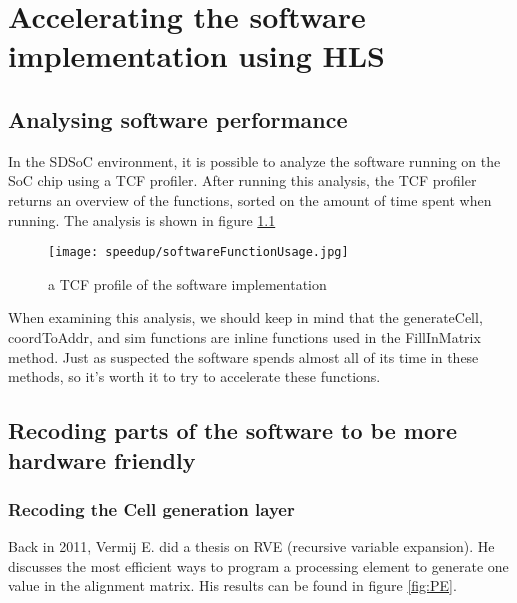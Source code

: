 
\chapter{Accelerating the software implementation using HLS}
\label{ch:HardwareImpl}

\section{Analysing software performance}

In the SDSoC environment, it is possible to analyze the software running on the SoC chip using a TCF profiler. After running this analysis, the TCF profiler returns an overview of the functions, sorted on the amount of time spent when running. The analysis is shown in figure \ref{fig:softwareFunctionUsage}

\begin{figure}[H]
	\centering
	\texttt{[image: speedup/softwareFunctionUsage.jpg]}
	\caption{a TCF profile of the software implementation}
	\label{fig:softwareFunctionUsage}
\end{figure}

When examining this analysis, we should keep in mind that the generateCell, coordToAddr, and sim functions are inline functions used in the FillInMatrix method. Just as suspected the software spends almost all of its time in these methods, so it's worth it to try to accelerate these functions.

\section{Recoding parts of the software to be more hardware friendly}

\subsection{Recoding the Cell generation layer}

Back in 2011, Vermij E. did a thesis\cite{Vermij} on RVE (recursive variable expansion). He discusses the most efficient ways to program a processing element to generate one value in the alignment matrix. His results can be found in figure \ref{fig:PE}. 

